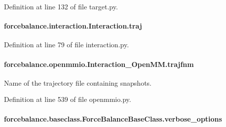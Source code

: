 Definition at line 132 of file target.\-py.

\hypertarget{classforcebalance_1_1interaction_1_1Interaction_af838808df9bf58ead305d079ccf21f8a}{
\paragraph[{traj}]{\setlength{\rightskip}{0pt plus 5cm}forcebalance.\-interaction.\-Interaction.\-traj\hspace{0.3cm}{\ttfamily [inherited]}}}\label{classforcebalance_1_1interaction_1_1Interaction_af838808df9bf58ead305d079ccf21f8a}


Definition at line 79 of file interaction.\-py.

\hypertarget{classforcebalance_1_1openmmio_1_1Interaction__OpenMM_a0ea6f8e123f0120022c750e91121b178}{
\paragraph[{trajfnm}]{\setlength{\rightskip}{0pt plus 5cm}forcebalance.\-openmmio.\-Interaction\-\_\-\-Open\-M\-M.\-trajfnm}}\label{classforcebalance_1_1openmmio_1_1Interaction__OpenMM_a0ea6f8e123f0120022c750e91121b178}


Name of the trajectory file containing snapshots. 



Definition at line 539 of file openmmio.\-py.

\hypertarget{classforcebalance_1_1baseclass_1_1ForceBalanceBaseClass_a8088e1e20cbd6bc175fb9c9fe9fa0f18}{
\paragraph[{verbose\-\_\-options}]{\setlength{\rightskip}{0pt plus 5cm}forcebalance.\-baseclass.\-Force\-Balance\-Base\-Class.\-verbose\-\_\-options\hspace{0.3cm}{\ttfamily [inherited]}}}\label{classforcebalance_1_1baseclass_1_1ForceBalanceBaseClass_a8088e1e20cbd6bc175fb9c9fe9fa0f18}


